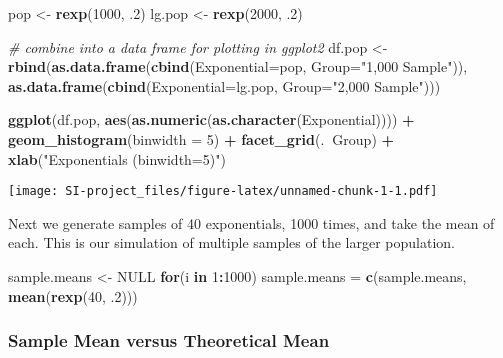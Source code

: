 \documentclass[]{article}
\newenvironment{Shaded}{\begin{snugshade}}{\end{snugshade}}
\newcommand{\KeywordTok}[1]{\textcolor[rgb]{0.13,0.29,0.53}{\textbf{#1}}}
\newcommand{\DataTypeTok}[1]{\textcolor[rgb]{0.13,0.29,0.53}{#1}}
\newcommand{\DecValTok}[1]{\textcolor[rgb]{0.00,0.00,0.81}{#1}}
\newcommand{\StringTok}[1]{\textcolor[rgb]{0.31,0.60,0.02}{#1}}
\newcommand{\CommentTok}[1]{\textcolor[rgb]{0.56,0.35,0.01}{\textit{#1}}}
\newcommand{\OtherTok}[1]{\textcolor[rgb]{0.56,0.35,0.01}{#1}}
\newcommand{\ControlFlowTok}[1]{\textcolor[rgb]{0.13,0.29,0.53}{\textbf{#1}}}
\newcommand{\OperatorTok}[1]{\textcolor[rgb]{0.81,0.36,0.00}{\textbf{#1}}}
\newcommand{\NormalTok}[1]{#1}
\begin{document}
\begin{Shaded}
\begin{Highlighting}[]
\NormalTok{pop <-}\StringTok{ }\KeywordTok{rexp}\NormalTok{(}\DecValTok{1000}\NormalTok{, .}\DecValTok{2}\NormalTok{)}
\NormalTok{lg.pop <-}\StringTok{ }\KeywordTok{rexp}\NormalTok{(}\DecValTok{2000}\NormalTok{, .}\DecValTok{2}\NormalTok{)}

\CommentTok{# combine into a data frame for plotting in ggplot2}
\NormalTok{df.pop <-}\StringTok{ }\KeywordTok{rbind}\NormalTok{(}\KeywordTok{as.data.frame}\NormalTok{(}\KeywordTok{cbind}\NormalTok{(}\DataTypeTok{Exponential=}\NormalTok{pop, }\DataTypeTok{Group=}\StringTok{"1,000 Sample"}\NormalTok{)),}
                   \KeywordTok{as.data.frame}\NormalTok{(}\KeywordTok{cbind}\NormalTok{(}\DataTypeTok{Exponential=}\NormalTok{lg.pop, }\DataTypeTok{Group=}\StringTok{"2,000 Sample"}\NormalTok{)))}

\KeywordTok{ggplot}\NormalTok{(df.pop, }\KeywordTok{aes}\NormalTok{(}\KeywordTok{as.numeric}\NormalTok{(}\KeywordTok{as.character}\NormalTok{(Exponential)))) }\OperatorTok{+}\StringTok{ }
\StringTok{  }\KeywordTok{geom_histogram}\NormalTok{(}\DataTypeTok{binwidth =} \DecValTok{5}\NormalTok{) }\OperatorTok{+}
\StringTok{  }\KeywordTok{facet_grid}\NormalTok{(.}\OperatorTok{~}\NormalTok{Group) }\OperatorTok{+}
\StringTok{  }\KeywordTok{xlab}\NormalTok{(}\StringTok{"Exponentials (binwidth=5)"}\NormalTok{)}
\end{Highlighting}
\end{Shaded}

\texttt{[image: SI-project\_files/figure-latex/unnamed-chunk-1-1.pdf]}

Next we generate samples of 40 exponentials, 1000 times, and take the
mean of each. This is our simulation of multiple samples of the larger
population.

\begin{Shaded}
\begin{Highlighting}[]
\NormalTok{sample.means <-}\StringTok{ }\OtherTok{NULL}
\ControlFlowTok{for}\NormalTok{(i }\ControlFlowTok{in} \DecValTok{1}\OperatorTok{:}\DecValTok{1000}\NormalTok{) sample.means =}\StringTok{ }\KeywordTok{c}\NormalTok{(sample.means, }\KeywordTok{mean}\NormalTok{(}\KeywordTok{rexp}\NormalTok{(}\DecValTok{40}\NormalTok{, .}\DecValTok{2}\NormalTok{)))}
\end{Highlighting}
\end{Shaded}

\subsubsection{Sample Mean versus Theoretical
Mean}\label{sample-mean-versus-theoretical-mean}
\end{document}
